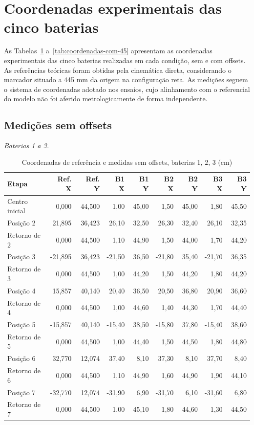 \section{Coordenadas experimentais das cinco baterias}
\label{sec:coordenadas-apendice}
As Tabelas~\ref{tab:coordenadas-sem-123} a~\ref{tab:coordenadas-com-45} apresentam as coordenadas experimentais das cinco baterias realizadas em cada condição, sem e com offsets. As referências teóricas foram obtidas pela cinemática direta, considerando o marcador situado a 445 mm da origem na configuração reta. As medições seguem o sistema de coordenadas adotado nos ensaios, cujo alinhamento com o referencial do modelo não foi aferido metrologicamente de forma independente.
\subsection{Medições sem offsets}
\noindent\textit{Baterias 1 a 3.}
\begin{table}[H]\centering
\caption{Coordenadas de referência e medidas sem offsets, baterias 1, 2, 3 (cm)}
\label{tab:coordenadas-sem-123}
\scriptsize\setlength{\tabcolsep}{2.4pt}
\begin{tabular}{lrrrrrrrr}\toprule
Etapa & Ref. X & Ref. Y & B1 X & B1 Y & B2 X & B2 Y & B3 X & B3 Y \\
\midrule
Centro inicial & 0,000 & 44,500 & 1,00 & 45,00 & 1,50 & 45,00 & 1,80 & 45,50\\
Posição 2 & 21,895 & 36,423 & 26,10 & 32,50 & 26,30 & 32,40 & 26,10 & 32,35\\
Retorno de 2 & 0,000 & 44,500 & 1,10 & 44,90 & 1,50 & 44,00 & 1,70 & 44,20\\
Posição 3 & -21,895 & 36,423 & -21,50 & 36,50 & -21,80 & 35,40 & -21,70 & 36,35\\
Retorno de 3 & 0,000 & 44,500 & 1,00 & 44,20 & 1,50 & 44,20 & 1,80 & 44,20\\
Posição 4 & 15,857 & 40,140 & 20,40 & 36,50 & 20,50 & 36,80 & 20,90 & 36,60\\
Retorno de 4 & 0,000 & 44,500 & 1,00 & 44,60 & 1,40 & 44,30 & 1,70 & 44,40\\
Posição 5 & -15,857 & 40,140 & -15,40 & 38,50 & -15,80 & 37,80 & -15,40 & 38,60\\
Retorno de 5 & 0,000 & 44,500 & 1,00 & 44,40 & 1,50 & 44,50 & 1,80 & 44,80\\
Posição 6 & 32,770 & 12,074 & 37,40 & 8,10 & 37,30 & 8,10 & 37,70 & 8,40\\
Retorno de 6 & 0,000 & 44,500 & 1,10 & 44,90 & 1,60 & 44,90 & 1,90 & 44,10\\
Posição 7 & -32,770 & 12,074 & -31,90 & 6,90 & -31,70 & 6,10 & -31,60 & 6,80\\
Retorno de 7 & 0,000 & 44,500 & 1,00 & 45,10 & 1,80 & 44,60 & 1,30 & 44,50\\
\bottomrule\end{tabular}
\par{}
\end{table}
